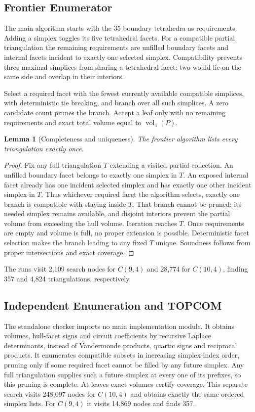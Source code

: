 \documentclass[11pt]{article}
\newtheorem{lemma}{Lemma}
\begin{document}
\subsection{Frontier Enumerator}
The main algorithm starts with the 35 boundary tetrahedra as requirements.
Adding a simplex toggles its five tetrahedral facets. For a compatible partial
triangulation the remaining requirements are unfilled boundary facets and
internal facets incident to exactly one selected simplex. Compatibility
prevents three maximal simplices from sharing a tetrahedral facet: two would
lie on the same side and overlap in their interiors.

Select a required facet with the fewest currently available compatible
simplices, with deterministic tie breaking, and branch over all such simplices.
A zero candidate count prunes the branch. Accept a leaf only with no remaining
requirements and exact total volume equal to $\operatorname{vol}_4(P)$.

\begin{lemma}[Completeness and uniqueness]
The frontier algorithm lists every triangulation exactly once.
\end{lemma}
\begin{proof}
Fix any full triangulation $T$ extending a visited partial collection. An
unfilled boundary facet belongs to exactly one simplex in $T$. An exposed
internal facet already has one incident selected simplex and has exactly one
other incident simplex in $T$. Thus whichever required facet the algorithm
selects, exactly one branch is compatible with staying inside $T$. That branch
cannot be pruned: its needed simplex remains available, and disjoint interiors
prevent the partial volume from exceeding the hull volume. Iteration reaches
$T$. Once requirements are empty and volume is full, no proper extension is
possible. Deterministic facet selection makes the branch leading to any fixed
$T$ unique. Soundness follows from proper intersections and exact coverage.
\end{proof}

The runs visit 2,109 search nodes for $C(9,4)$ and 28,774 for $C(10,4)$, finding
357 and 4,824 triangulations, respectively.

\subsection{Independent Enumeration and TOPCOM}
The standalone checker imports no main implementation module. It obtains
volumes, hull-facet signs and circuit coefficients by recursive Laplace
determinants, instead of Vandermonde products, quartic signs and reciprocal
products. It enumerates compatible subsets in increasing simplex-index order,
pruning only if some required facet cannot be filled by any future simplex.
Any full triangulation supplies such a future simplex at every one of its
prefixes, so this pruning is complete. At leaves exact volumes certify coverage.
This separate search visits 248,097 nodes for $C(10,4)$ and obtains exactly the
same ordered simplex lists. For $C(9,4)$ it visits 14,869 nodes and finds 357.
\end{document}
